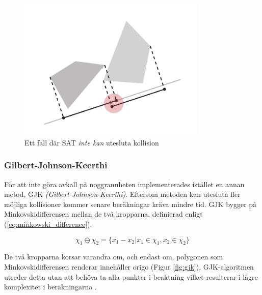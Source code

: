 \documentclass[a4paper,12pt,twopage,swedish]{article}
\begin{document}
\begin{figure}[H]
\centering
\includegraphics[width=0.8\textwidth]{illustrations/sepaxis2.pdf}
\caption{Ett fall där SAT \emph{inte kan} utesluta kollision}
\label{fig:separating_axis_2}
\end{figure}

\subsubsection{Gilbert-Johnson-Keerthi}
\label{sec:gjk}
För att inte göra avkall på noggrannheten implementerades istället en annan metod, GJK \cite[s.~30]{vella08} \emph{(Gilbert-Johnson-Keerthi)}. Eftersom metoden kan utesluta fler möjliga kollisioner kommer senare beräkningar kräva mindre tid. GJK bygger på Minkovskidifferensen mellan de två kropparna, definierad enligt (\ref{eq:minkowski_difference}).

\begin{equation}\label{eq:minkowski_difference}
\chi_1 \ominus \chi_2 = \{ x_1 - x_2|x_1 \in \chi_1, x_2 \in \chi_2 \}
\end{equation}

De två kropparna korsar varandra om, och endast om, polygonen som Minkovskidifferensen renderar innehåller origo (Figur \ref{fig:gjk}). GJK-algoritmen utreder detta utan att behöva ta alla punkter i beaktning vilket resulterar i lägre komplexitet i beräkningarna \cite{bergen99}.
\end{document}
